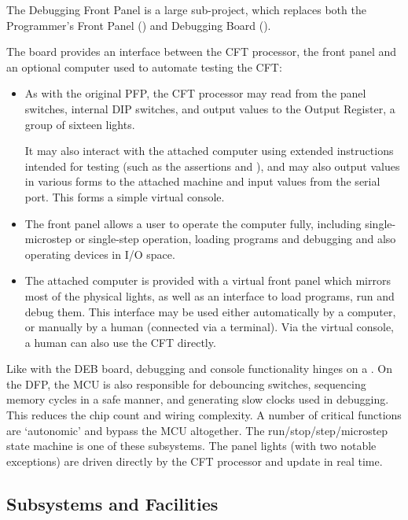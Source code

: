 
\label{chap:hard-dfp}

The Debugging Front Panel is a large sub-project, which replaces both
the Programmer's Front Panel () and Debugging
Board ().

The board provides an interface between
the CFT processor, the front panel and an optional computer used to
automate testing the CFT:

\begin{itemize}
\item As with the original PFP, the CFT processor may read from the
  panel switches, internal DIP switches, and output values to the
  Output Register, a group of sixteen lights.

  It may also interact with the attached computer using extended
  instructions intended for testing (such as the assertions
   and ), and may also output values in various
  forms to the attached machine and input values from the serial
  port. This forms a simple virtual console.

\item The front panel allows a user to operate the computer fully,
  including single-microstep or single-step operation, loading
  programs and debugging and also operating devices in I/O space. 

\item The attached computer is provided with a virtual front panel
  which mirrors most of the physical lights, as well as an interface
  to load programs, run and debug them. This interface may be used
  either automatically by a computer, or manually by a human
  (connected via a terminal). Via the virtual console, a human can
  also use the CFT directly.
\end{itemize}

Like with the DEB board, debugging and console functionality hinges on
a . On the DFP, the MCU is also responsible for debouncing
switches, sequencing memory cycles in a safe manner, and generating
slow clocks used in debugging. This reduces the chip count and wiring
complexity. A number of critical functions are ‘autonomic’ and bypass
the MCU altogether. The run/stop/step/microstep state machine is one
of these subsystems. The panel lights (with two notable exceptions)
are driven directly by the CFT processor and update in real time.

\subsection{Subsystems and Facilities}

